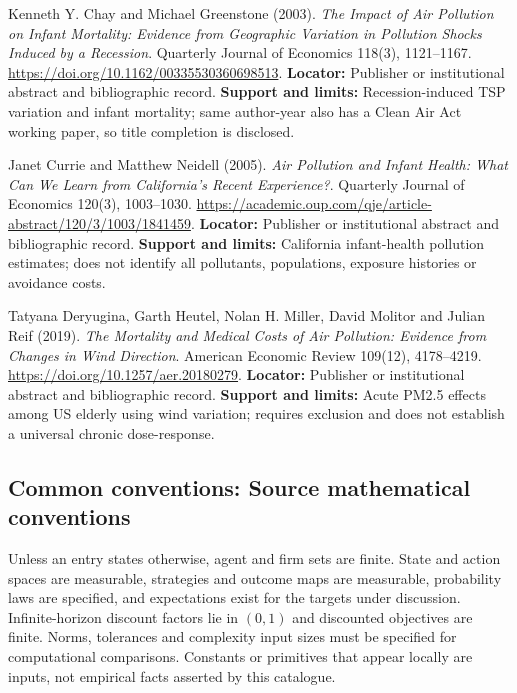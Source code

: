\documentclass[11pt,a4paper]{article}
\begin{document}
\begin{enumerate}[label={[\textnormal{S}\arabic*]},leftmargin=*]

\item Kenneth Y. Chay and Michael Greenstone (2003). \emph{The Impact of Air Pollution on Infant Mortality: Evidence from Geographic Variation in Pollution Shocks Induced by a Recession}. Quarterly Journal of Economics 118(3), 1121–1167. \url{https://doi.org/10.1162/00335530360698513}. \textbf{Locator:} Publisher or institutional abstract and bibliographic record. \textbf{Support and limits:} Recession-induced TSP variation and infant mortality; same author-year also has a Clean Air Act working paper, so title completion is disclosed.

\item Janet Currie and Matthew Neidell (2005). \emph{Air Pollution and Infant Health: What Can We Learn from California’s Recent Experience?}. Quarterly Journal of Economics 120(3), 1003–1030. \url{https://academic.oup.com/qje/article-abstract/120/3/1003/1841459}. \textbf{Locator:} Publisher or institutional abstract and bibliographic record. \textbf{Support and limits:} California infant-health pollution estimates; does not identify all pollutants, populations, exposure histories or avoidance costs.

\item Tatyana Deryugina, Garth Heutel, Nolan H. Miller, David Molitor and Julian Reif (2019). \emph{The Mortality and Medical Costs of Air Pollution: Evidence from Changes in Wind Direction}. American Economic Review 109(12), 4178–4219. \url{https://doi.org/10.1257/aer.20180279}. \textbf{Locator:} Publisher or institutional abstract and bibliographic record. \textbf{Support and limits:} Acute PM2.5 effects among US elderly using wind variation; requires exclusion and does not establish a universal chronic dose-response.

\end{enumerate}

\subsection*{Common conventions: Source mathematical conventions}

Unless an entry states otherwise, agent and firm sets are finite. State and action spaces are measurable, strategies and outcome maps are measurable, probability laws are specified, and expectations exist for the targets under discussion. Infinite-horizon discount factors lie in $(0,1)$ and discounted objectives are finite. Norms, tolerances and complexity input sizes must be specified for computational comparisons. Constants or primitives that appear locally are inputs, not empirical facts asserted by this catalogue.
\end{document}
